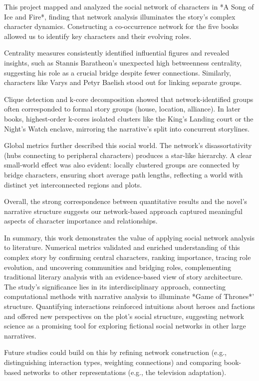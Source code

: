 \documentclass[12pt, a4paper]{article}
\begin{document}
	This project mapped and analyzed the social network of characters in *A Song of Ice and Fire*, finding that network analysis illuminates the story's complex character dynamics. Constructing a co-occurrence network for the five books allowed us to identify key characters and their evolving roles.

	Centrality measures consistently identified influential figures and revealed insights, such as Stannis Baratheon's unexpected high betweenness centrality, suggesting his role as a crucial bridge despite fewer connections. Similarly, characters like Varys and Petyr Baelish stood out for linking separate groups.

	Clique detection and k-core decomposition showed that network-identified groups often corresponded to formal story groups (house, location, alliance). In later books, highest-order k-cores isolated clusters like the King's Landing court or the Night's Watch enclave, mirroring the narrative's split into concurrent storylines.

	Global metrics further described this social world. The network's disassortativity (hubs connecting to peripheral characters) produces a star-like hierarchy. A clear small-world effect was also evident: locally clustered groups are connected by bridge characters, ensuring short average path lengths, reflecting a world with distinct yet interconnected regions and plots.

	Overall, the strong correspondence between quantitative results and the novel's narrative structure suggests our network-based approach captured meaningful aspects of character importance and relationships.

	In summary, this work demonstrates the value of applying social network analysis to literature. Numerical metrics validated and enriched understanding of this complex story by confirming central characters, ranking importance, tracing role evolution, and uncovering communities and bridging roles, complementing traditional literary analysis with an evidence-based view of story architecture. The study's significance lies in its interdisciplinary approach, connecting computational methods with narrative analysis to illuminate *Game of Thrones*' structure. Quantifying interactions reinforced intuitions about heroes and factions and offered new perspectives on the plot's social structure, suggesting network science as a promising tool for exploring fictional social networks in other large narratives.

	Future studies could build on this by refining network construction (e.g., distinguishing interaction types, weighting connections) and comparing book-based networks to other representations (e.g., the television adaptation).
	
\end{document}
